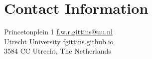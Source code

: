\section{Contact Information}

Princetonplein 1                    
\hfill \href{mailto:f.w.r.gittins@uu.nl}{f.w.r.gittins@uu.nl} \\
Utrecht University                  
\hfill \href{https://fgittins.github.io}{fgittins.github.io} \\
3584 CC Utrecht, The Netherlands    



